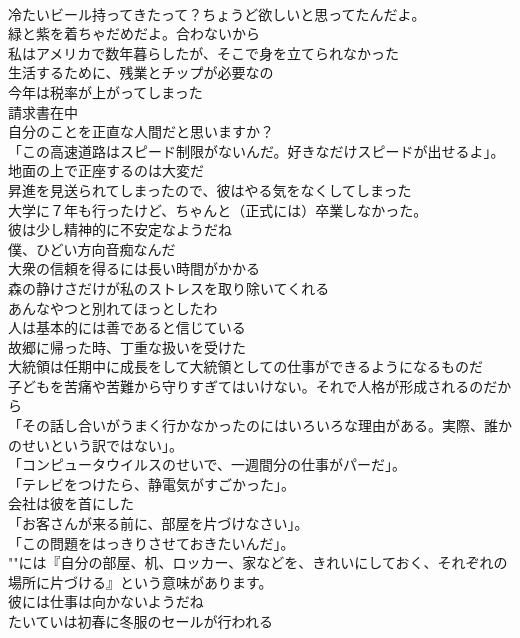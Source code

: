 \documentclass[8pt]{extreport}
\begin{document}
\begin{CJK}{UTF8}{min}
\\	冷たいビール持ってきたって？ちょうど欲しいと思ってたんだよ。	
\\	緑と紫を着ちゃだめだよ。合わないから	
\\	私はアメリカで数年暮らしたが、そこで身を立てられなかった	
\\	生活するために、残業とチップが必要なの	
\\	今年は税率が上がってしまった	
\\	請求書在中	
\\	自分のことを正直な人間だと思いますか？	
\\	「この高速道路はスピード制限がないんだ。好きなだけスピードが出せるよ」。	
\\	地面の上で正座するのは大変だ	
\\	昇進を見送られてしまったので、彼はやる気をなくしてしまった	
\\	大学に７年も行ったけど、ちゃんと（正式には）卒業しなかった。	
\\	彼は少し精神的に不安定なようだね	
\\	僕、ひどい方向音痴なんだ	
\\	大衆の信頼を得るには長い時間がかかる	
\\	森の静けさだけが私のストレスを取り除いてくれる	
\\	あんなやつと別れてほっとしたわ	
\\	人は基本的には善であると信じている	
\\	故郷に帰った時、丁重な扱いを受けた	
\\	大統領は任期中に成長をして大統領としての仕事ができるようになるものだ	
\\	子どもを苦痛や苦難から守りすぎてはいけない。それで人格が形成されるのだから	
\\	「その話し合いがうまく行かなかったのにはいろいろな理由がある。実際、誰かのせいという訳ではない」。	
\\	「コンピュータウイルスのせいで、一週間分の仕事がパーだ」。	
\\	「テレビをつけたら、静電気がすごかった」。	
\\	会社は彼を首にした	
\\	「お客さんが来る前に、部屋を片づけなさい」。	
\\	「この問題をはっきりさせておきたいんだ」。	
\\	""には『自分の部屋、机、ロッカー、家などを、きれいにしておく、それぞれの場所に片づける』という意味があります。
\\	彼には仕事は向かないようだね	
\\	たいていは初春に冬服のセールが行われる	

\end{CJK}
\end{document}
